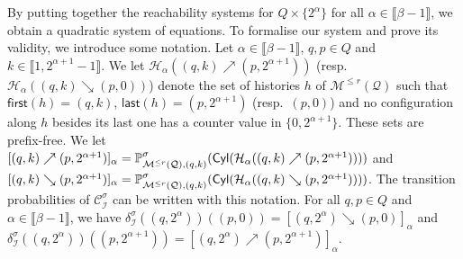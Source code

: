 \documentclass[a4paper,UKenglish,cleveref,autoref,thm-restate,colorlinks]{lipics-v2021}
\newcommand{\integerInterval}[1]{\llbracket{}#1\rrbracket{}}
\newcommand{\cyl}[1]{\mathsf{Cyl}(#1)}
\newcommand{\mdp}{\mathcal{M}}
\newcommand{\mdpTrans}{\delta}
\newcommand{\histPart}{\mathcal{H}}
\newcommand{\hist}{h}
\newcommand{\last}[1]{\mathsf{last}(#1)}
\newcommand{\first}[1]{\mathsf{first}(#1)}
\newcommand{\ocmdp}{\mathcal{Q}}
\newcommand{\ocmdpFin}[2]{\mdp^{\leq #2}(#1)}
\newcommand{\ocStateSpace}{Q}
\newcommand{\ocState}{q}
\newcommand{\ocStateB}{p}
\newcommand{\ocCount}{k}
\newcommand{\counterUB}{r}
\newcommand{\mchain}{\mathcal{C}}
\newcommand{\intPart}{\mathcal{I}}
\newcommand{\powerIndex}{\alpha}
\newcommand{\powerMax}{\beta}
\newcommand{\compressChainStrat}[1]{\mchain^{#1}_{\intPart}}
\newcommand{\compressChain}{\compressChainStrat{\strat}}
\newcommand{\compressChainTransTemplate}[2]{\mdpTrans^{#1}_{#2}}
\newcommand{\compressChainTrans}{\compressChainTransTemplate{\strat}{\intPart}}
\newcommand{\upProba}[5]{[(#1,#2)\nearrow{}(#3,#4)]_{#5}}
\newcommand{\downProba}[5]{[(#1,#2)\searrow{}(#3,#4)]_{#5}}
\newcommand{\upHistSet}[5]{\histPart_{#5}((#1,#2)\nearrow{}(#3,#4))}
\newcommand{\downHistSet}[5]{\histPart_{#5}((#1,#2)\searrow{}(#3,#4))}
\newcommand{\stratGeneric}[1]{{\sigma_{#1}}}
\newcommand{\strat}{\stratGeneric{}}
\begin{document}
By putting together the reachability systems for $\ocStateSpace\times\{2^\powerIndex\}$ for all $\powerIndex\in\integerInterval{\powerMax-1}$, we obtain a quadratic system of equations.
To formalise our system and prove its validity, we introduce some notation.
Let $\powerIndex\in\integerInterval{\powerMax-1}$, $\ocState, \ocStateB\in\ocStateSpace$ and $\ocCount\in\integerInterval{1, 2^{\powerIndex+1}-1}$.
We let $\upHistSet{\ocState}{\ocCount}{\ocStateB}{2^{\powerIndex+1}}{\powerIndex}$ (resp.~$\downHistSet{\ocState}{\ocCount}{\ocStateB}{0}{\powerIndex}$) denote the set of histories $\hist$ of $\ocmdpFin{\ocmdp}{\counterUB}$  such that $\first{\hist}=(\ocState, \ocCount)$, $\last{\hist}=(\ocStateB, 2^{\powerIndex+1})$ (resp.~$(\ocStateB, 0)$) and no configuration along $\hist$ besides its last one has a counter value in $\{0, 2^{\powerIndex+1}\}$.
These sets are prefix-free.
We let $\upProba{\ocState}{\ocCount}{\ocStateB}{2^{\powerIndex+1}}{\powerIndex}=
\probaGverb{\ocmdpFin{\ocmdp}{\counterUB}}{(\ocState, \ocCount)}{\strat}(\cyl{\upHistSet{\ocState}{\ocCount}{\ocStateB}{2^{\powerIndex+1}}{\powerIndex}})$ and
$\downProba{\ocState}{\ocCount}{\ocStateB}{2^{\powerIndex+1}}{\powerIndex}=
\probaGverb{\ocmdpFin{\ocmdp}{\counterUB}}{(\ocState, \ocCount)}{\strat}(\cyl{\downHistSet{\ocState}{\ocCount}{\ocStateB}{2^{\powerIndex+1}}{\powerIndex}})$.
The transition probabilities of $\compressChain$ can be written with this notation.
For all $\ocState, \ocStateB\in\ocStateSpace$ and $\powerIndex\in\integerInterval{\powerMax-1}$, we have $\compressChainTrans((\ocState, 2^\powerIndex))((\ocStateB, 0)) = \downProba{\ocState}{2^\powerIndex}{\ocStateB}{0}{\powerIndex}$ and $\compressChainTrans((\ocState,2^\powerIndex))((\ocStateB, 2^{\powerIndex+1})) = \upProba{\ocState}{2^\powerIndex}{\ocStateB}{2^{\powerIndex+1}}{\powerIndex}$.
\end{document}
